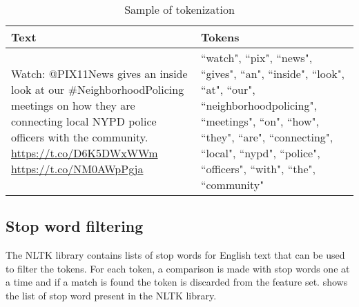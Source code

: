 \begin{table}[h]
\begin{center}
\caption{Sample of tokenization}
\label{tbl:tokenization_sample}
\begin{tabular}{p{8cm}p{5cm}}
\toprule 
Text&Tokens\\
\midrule 
Watch: @PIX11News  gives an inside look at our \#NeighborhoodPolicing
meetings on how they are connecting local NYPD police officers with
the community. \url{https://t.co/D6K5DWxWWm} \url{https://t.co/NM0AWpPgja} & ``watch", ``pix", ``news", ``gives", ``an", ``inside", ``look", ``at", ``our", ``neighborhoodpolicing", ``meetings", ``on", ``how", ``they", ``are", ``connecting", ``local", ``nypd", ``police", ``officers", ``with", ``the", ``community" \\
\bottomrule
\end{tabular}
\end{center}
\end{table}

\subsection{Stop word filtering}
The NLTK library contains lists of stop words for English text that can be used to filter the tokens. For each token, a comparison is made with stop words one at a time and if a match is found the token is discarded from the feature set.  shows the list of stop word present in the NLTK library.

